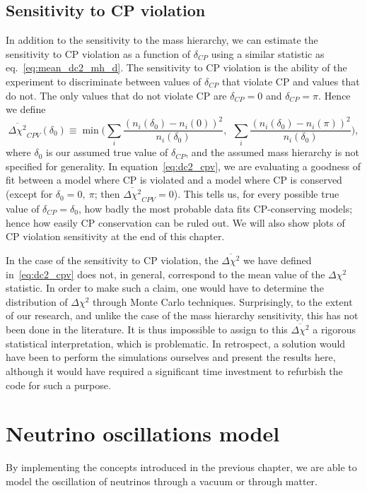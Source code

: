 \subsection{Sensitivity to CP violation}\label{sec:sens_cpv}
In addition to the sensitivity to the mass hierarchy, we can estimate the
sensitivity to CP violation as a function of $\delta_{CP}$ using a similar
statistic as eq.~\ref{eq:mean_dc2_mh_d}. The sensitivity to CP violation
is the ability of the experiment to discriminate between values of
$\delta_{CP}$ that violate CP and values that do not. The only values that
do not violate CP are $\delta_{CP}=0$ and $\delta_{CP}=\pi$. Hence we define
\begin{equation}
	\overline{\Delta\chi^2}_{CPV}(\delta_0) \equiv \min\bigg(\sum_i
	\frac{(n_i(\delta_0) - n_i(0))^2}{n_i(\delta_0)},~~\sum_i
	\frac{(n_i(\delta_0) - n_i(\pi))^2}{n_i(\delta_0)}\bigg),\label{eq:dc2_cpv}
\end{equation}
where $\delta_0$ is our assumed true value of $\delta_{CP}$, and the assumed mass
hierarchy is not specified for generality. In equation~\ref{eq:dc2_cpv}, we are
evaluating a goodness of fit between a model where CP is violated and a model
where CP is conserved (except for $\delta_0=0,~\pi$; then
$\overline{\Delta\chi^2}_{CPV}=0$). 
This tells us, for every possible true value of $\delta_{CP}=\delta_0$, how
badly the most probable data fits CP-conserving models; hence how easily CP
conservation can be ruled out. We will also show plots of CP violation sensitivity
at the end of this chapter. 

In the case of the sensitivity to CP violation, the $\overline{\Delta\chi^2}$
we have defined in~\ref{eq:dc2_cpv} does not, in general, correspond to the mean
value of the $\Delta\chi^2$ statistic. In order to make such a claim, one would
have to determine the distribution of $\Delta\chi^2$ through Monte Carlo
techniques. Surprisingly, to the extent of our research, and unlike the case of
the mass hierarchy sensitivity, this has not been done in the literature.  It
is thus impossible to assign to this $\overline{\Delta\chi^2}$ a rigorous
statistical interpretation, which is problematic. In retrospect, a solution
would have been to perform the simulations ourselves and present the results
here, although it would have required a significant time investment to
refurbish the code for such a purpose.


\section{Neutrino oscillations model}
By implementing the concepts introduced in the previous chapter, we are able to
model the oscillation of neutrinos through a vacuum or through matter.

